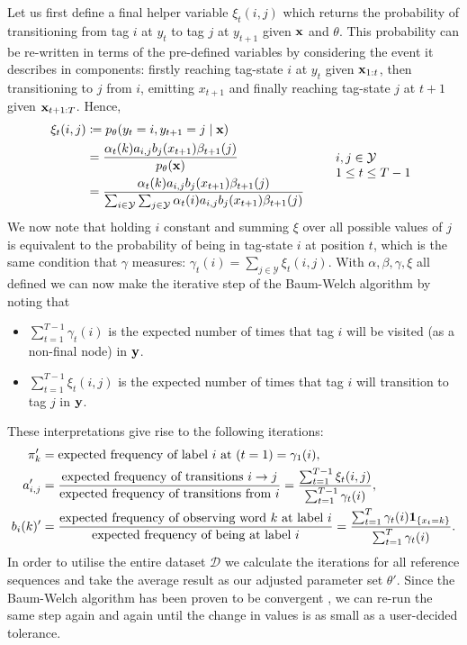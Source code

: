 \documentclass[../main.tex]{subfiles}
\begin{document}
Let us first define a final helper variable $\xi_t(i,j)$ which returns the probability of transitioning from tag $i$ at $y_t$ to tag $j$ at $y_{t+1}$ given $\mathbf{x}$ and $\theta$.
This probability can be re-written in terms of the pre-defined variables by considering the event it describes in components: firstly reaching tag-state $i$ at $y_t$ given $\mathbf{x}_{1:t}$, then transitioning to $j$ from $i$, emitting $x_{t+1}$ and finally reaching tag-state $j$ at $t+1$ given $\mathbf{x}_{t+1:T}$. Hence,
\begin{equation*}
\begin{aligned}
    \xi_t(i,j) &\coloneqq p_\theta(y_t = i, y_{t+1} = j \mid \mathbf{x}) \\
    &= \frac{\alpha_t(k)a_{i,j}b_j(x_{t+1})\beta_{t+1}(j)}{p_\theta(\mathbf{x})} \\
    &= \frac{\alpha_t(k)a_{i,j}b_j(x_{t+1})\beta_{t+1}(j)}{\sum_{i \in \mathcal{Y}} \sum_{j \in \mathcal{Y}} \alpha_t(i)a_{i,j}b_j(x_{t+1})\beta_{t+1}(j)}
    \end{aligned} \qquad \begin{array}{lr}
            i,j \in \mathcal{Y} \\
            1 \leq t \leq T-1
        \end{array}
\end{equation*}
We now note that holding $i$ constant and summing $\xi$ over all possible values of $j$ is equivalent to the probability of being in tag-state $i$ at position $t$, which is the same condition that $\gamma$ measures: $\gamma_t(i) = \sum_{j \in \mathcal{Y}} \xi_t(i,j)$.
With $\alpha, \beta, \gamma, \xi$ all defined we can now make the iterative step of the Baum-Welch algorithm by noting that
\begin{itemize}
    \item $\sum_{t=1}^{T-1} \gamma_t(i)$ is the expected number of times that tag $i$ will be visited (as a non-final node) in $\mathbf{y}$.
    \item $\sum_{t=1}^{T-1} \xi_t(i, j)$ is the expected number of times that tag $i$ will transition to tag $j$ in $\mathbf{y}$.
\end{itemize}
These interpretations give rise to the following iterations:
\begin{align*}
    \pi_k' &= \text{expected frequency of label $i$ at $(t=1)$} = \gamma_1(i), \\
    a_{i,j}' &= \frac{\text{expected frequency of transitions $i \rightarrow j$}}{\text{expected frequency of transitions from $i$}} = \frac{\sum_{t=1}^{T-1} \xi_t(i,j)}{\sum_{t=1}^{T-1} \gamma_t(i)}, \\
    b_i(k)' &= \frac{\text{expected frequency of observing word $k$ at label $i$}}{\text{expected frequency of being at label $i$}} = \frac{\sum_{t=1}^T \gamma_t(i)\mathbf{1}_{\{x_t = k\}}}{\sum_{t=1}^{T} \gamma_t(i)}.
\end{align*}
In order to utilise the entire dataset $\mathcal{D}$ we calculate the iterations for all reference sequences and take the average result as our adjusted parameter set $\theta'$.
Since the Baum-Welch algorithm has been proven to be convergent \autocite{baum-1972-alg}, we can re-run the same step again and again until the change in values is as small as a user-decided tolerance.
\end{document}
